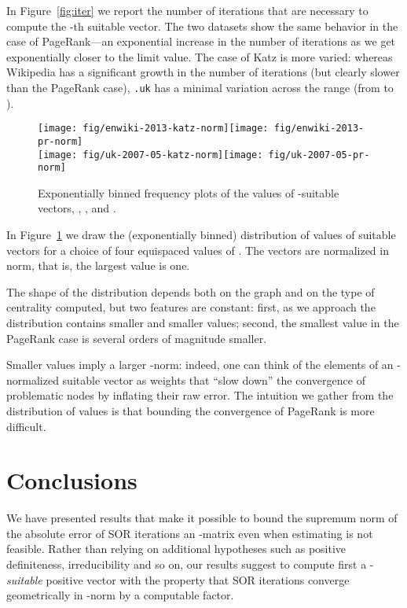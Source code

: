 \documentclass{article}
\newcommand{\1}{\mathbf 1}
\begin{document}
In Figure~\ref{fig:iter} we report the number of iterations that are necessary to compute the -th suitable
vector. The two datasets show the same behavior in the case of PageRank---an exponential
increase in the number of iterations as we get exponentially closer to the limit value. The case of Katz is more varied: whereas Wikipedia has a significant
growth in the number of iterations (but clearly slower than the PageRank case), \texttt{.uk} has a minimal variation 
across the range (from  to ).  

\begin{figure}[htb]
\centering
\texttt{[image: fig/enwiki-2013-katz-norm]}\quad\texttt{[image: fig/enwiki-2013-pr-norm]}\\
\texttt{[image: fig/uk-2007-05-katz-norm]}\quad\texttt{[image: fig/uk-2007-05-pr-norm]}\\
\caption{\label{fig:norm}Exponentially binned frequency plots of the values of -suitable vectors, , ,  and .}
\end{figure}


In Figure~\ref{fig:norm} we draw the (exponentially binned) distribution of values of suitable vectors for
a choice of four equispaced values of . The vectors are normalized in  norm, that is,
the largest value is one.

The shape of the distribution depends both on the graph
and on the type of centrality computed, but two features are constant: first, as we approach  the distribution
contains smaller and smaller values; second, the smallest value in the PageRank case is several orders of magnitude smaller.

Smaller values imply a larger -norm: indeed, one can think of the elements of an -normalized suitable
vector  as weights that ``slow down'' the convergence of problematic nodes by inflating their raw error. The intuition
we gather from the distribution of values is that bounding the convergence of PageRank is more difficult. 

\section{Conclusions}

We have presented results that make it possible to bound the supremum norm of
the absolute error of SOR iterations an -matrix  even when estimating
 is not feasible. Rather than
 relying on additional hypotheses such as positive definiteness, irreducibility
 and so on, our results suggest to
compute first a -\emph{suitable} positive vector  with the property
that SOR iterations converge geometrically in -norm by a computable factor.
\end{document}
